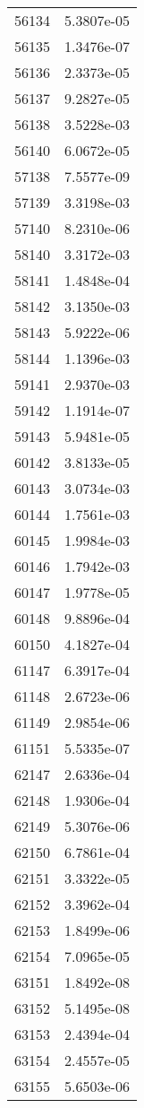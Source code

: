 \begin{table}[h!]
\begin{tabular}{|| c || c |}
56134 & 5.3807e-05 \\
56135 & 1.3476e-07 \\
56136 & 2.3373e-05 \\
56137 & 9.2827e-05 \\
56138 & 3.5228e-03 \\
56140 & 6.0672e-05 \\
57138 & 7.5577e-09 \\
57139 & 3.3198e-03 \\
57140 & 8.2310e-06 \\
58140 & 3.3172e-03 \\
58141 & 1.4848e-04 \\
58142 & 3.1350e-03 \\
58143 & 5.9222e-06 \\
58144 & 1.1396e-03 \\
59141 & 2.9370e-03 \\
59142 & 1.1914e-07 \\
59143 & 5.9481e-05 \\
60142 & 3.8133e-05 \\
60143 & 3.0734e-03 \\
60144 & 1.7561e-03 \\
60145 & 1.9984e-03 \\
60146 & 1.7942e-03 \\
60147 & 1.9778e-05 \\
60148 & 9.8896e-04 \\
60150 & 4.1827e-04 \\
61147 & 6.3917e-04 \\
61148 & 2.6723e-06 \\
61149 & 2.9854e-06 \\
61151 & 5.5335e-07 \\
62147 & 2.6336e-04 \\
62148 & 1.9306e-04 \\
62149 & 5.3076e-06 \\
62150 & 6.7861e-04 \\
62151 & 3.3322e-05 \\
62152 & 3.3962e-04 \\
62153 & 1.8499e-06 \\
62154 & 7.0965e-05 \\
63151 & 1.8492e-08 \\
63152 & 5.1495e-08 \\
63153 & 2.4394e-04 \\
63154 & 2.4557e-05 \\
63155 & 5.6503e-06 \\

\end{tabular}
\end{table}
